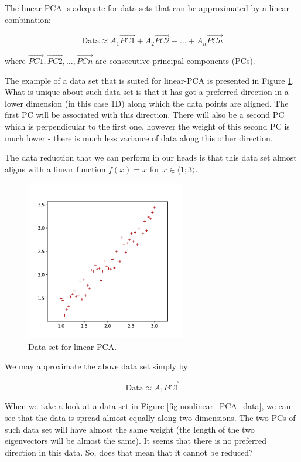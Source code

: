 \documentclass[10pt,twocolumn]{article}
\begin{document}
The linear-PCA is adequate for data sets that can be approximated by a linear combination:

\begin{equation}
\text{Data} \approx A_1 \vec{PC1} + A_2 \vec{PC2} + \dots + A_n \vec{PCn}
\end{equation}

where $\vec{PC1}, \vec{PC2}, \dots, \vec{PCn}$ are consecutive principal components (PCs).

The example of a data set that is suited for linear-PCA is presented in Figure \ref{fig:linear_PCA_data}. What is unique about such data set is that it has got a preferred direction in a lower dimension (in this case 1D) along which the data points are aligned. The first PC will be associated with this direction. There will also be a second PC which is perpendicular to the first one, however the weight of this second PC is much lower - there is much less variance of data along this other direction.

The data reduction that we can perform in our heads is that this data set almost aligns with a linear function $f(x) = x$ for $x \in \langle 1; 3 \rangle$.

\begin{figure}[H]
\centering\includegraphics[width=7cm]{../python/PCA-fake-datasets/PCA_linear_scatter_1.png}
\caption{Data set for linear-PCA.}			
\label{fig:linear_PCA_data}
\end{figure}

We may approximate the above data set simply by:

\begin{equation}
\text{Data} \approx A_1 \vec{PC1}
\end{equation}

When we take a look at a data set in Figure \ref{fig:nonlinear_PCA_data}, we can see that the data is spread almost equally along two dimensions. The two PCs of such data set will have almost the same weight (the length of the two eigenvectors will be almost the same). It seems that there is no preferred direction in this data. So, does that mean that it cannot be reduced?
\end{document}
